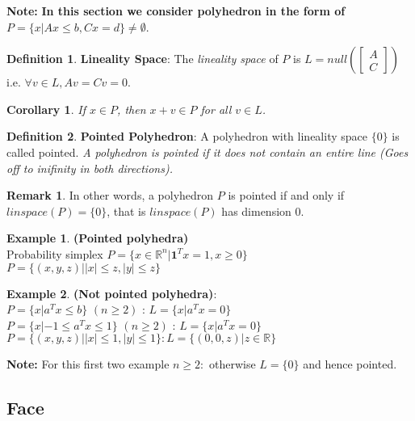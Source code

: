 \documentclass[10pt]{article}
\def\R{\mathbb{R}}
\def\em{\emptyset}
\newtheorem{cor}{Corollary}[thm]
\theoremstyle{definition}
\newtheorem{defn}{Definition}[section]
\newtheorem{example}{Example}[section]
\newtheorem{remark}{Remark}[section]
\newcommand{\Note}[0]{\noindent\textbf{Note: }}
\begin{document}
\Note \textbf{In this section we consider polyhedron in the form of $P = \{x | Ax \le b, Cx = d\} \neq \em$}.

\begin{defn} \textbf{Lineality Space}:
	The \textit{lineality space} of $P$ is $L = null(\begin{bmatrix}
			A \\ C
		\end{bmatrix})$
	i.e. $\forall v \in L, Av = Cv = 0$.
\end{defn}

\begin{cor}
	If $x \in P$, then $x + v \in P$ for all $v \in L$.
\end{cor}

\begin{defn} \textbf{Pointed Polyhedron}:
	A polyhedron with lineality space $\{0\}$ is called pointed.
	\textit{A polyhedron is pointed if it does not contain an entire line
		(Goes off to inifinity in both directions).}
\end{defn}

\begin{remark}
	In other words, a polyhedron $P$ is pointed if and only if $linspace(P) = \{0\}$, that is $linspace(P)$ has dimension $0$.
\end{remark}

\begin{example}\textbf{(Pointed polyhedra)}\\
	Probability simplex $P = \{x \in \R^n | \textbf{1}^Tx = 1 , x \ge 0\}$\\
	$P = \{(x,y,z) | |x| \le z, |y| \le z \}$
\end{example}

\begin{example}\textbf{(Not pointed polyhedra)}:\\
	$P = \{x | a^Tx \le b\}$ $(n \ge 2)$ : $L = \{x | a^Tx = 0\}$\\
	$P = \{x | -1 \le a^Tx \le 1\}$ $(n \ge 2)$ : $L = \{x | a^Tx = 0\}$\\
	$P = \{(x,y,z) | |x| \le 1, |y| \le 1 \} : L = \{(0,0,z) | z \in \R\}$
\end{example}

\Note For this first two example $n \ge 2 :$ otherwise $L = \{0\}$ and hence pointed.

\subsection{Face}
\end{document}
